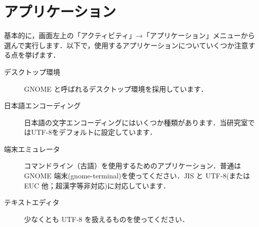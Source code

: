 \documentclass[main]{subfiles}
\begin{document}
\chapter{アプリケーション}

基本的に，画面左上の「アクティビティ」→「アプリケーション」メニューから選んで実行します．以下で，使用するアプリケーションについていくつか注意する点を挙げます．

\begin{description}
    \item[デスクトップ環境] GNOME と呼ばれるデスクトップ環境を採用しています．

    \item[日本語エンコーディング] 日本語の文字エンコーディングにはいくつか種類があります．当研究室ではUTF-8をデフォルトに設定しています．

    
    \item[端末エミュレータ] コマンドライン（古語）を使用するためのアプリケーション．普通は GNOME 端末(gnome-terminal)を使ってください．JIS と UTF-8(または EUC 他；超漢字等非対応)に対応しています．

    \item[テキストエディタ] 少なくとも UTF-8 を扱えるものを使ってください．

\end{description}
\end{document}
